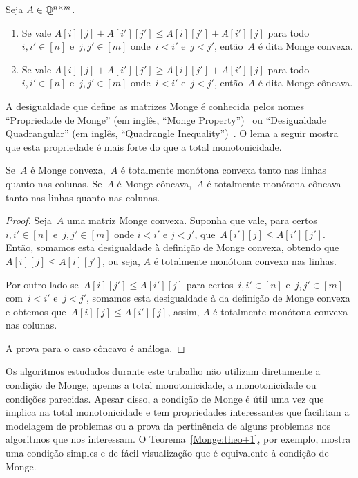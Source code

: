 \begin{defi} \label{defi:MatrizMonge}
Seja $A \in \mathbb{Q}^{n \times m}$.
    \begin{enumerate}
        \item Se vale $A[i][j] + A[i'][j'] \leq A[i][j'] + A[i'][j]$ para todo~${i,i' \in [n]}$ e~${j,j' \in [m]}$ onde~${i<i'}$ e~${j<j'}$, então~$A$ é dita Monge convexa.
        \item Se vale $A[i][j] + A[i'][j'] \geq A[i][j'] + A[i'][j]$ para todo~${i,i' \in [n]}$ e~${j,j' \in [m]}$ onde~${i<i'}$ e~${j<j'}$, então~$A$ é dita Monge côncava.
    \end{enumerate}
\end{defi}

A desigualdade que define as matrizes Monge é conhecida pelos nomes ``Propriedade de Monge'' (em inglês, ``Monge Property'')~\cite{Burkard:1996} ou ``Desigualdade Quadrangular'' (em inglês, ``Quadrangle Inequality'')~\cite{Yao:1980,Bein:2009}. O lema a seguir mostra que esta propriedade é mais forte do que a total monotonicidade. 

\begin{lema} \label{Monge:MCtoTM}
Se~$A$ é Monge convexa,~$A$ é totalmente monótona convexa tanto nas linhas quanto nas colunas. Se~$A$ é Monge côncava,~$A$ é totalmente monótona côncava tanto nas linhas quanto nas colunas.
\end{lema}

\begin{proof}
Seja~$A$ uma matriz Monge convexa. Suponha que vale, para certos~$i,i' \in [n]$ e~${ j,j' \in [m] }$ onde $i < i'$ e $j < j'$, que~$A[i'][j] \leq A[i'][j']$. Então, somamos esta desigualdade à definição de Monge convexa, obtendo que~$A[i][j] \leq A[i][j']$, ou seja, $A$ é totalmente monótona convexa nas linhas.  

Por outro lado se~${ A[i][j'] \leq A[i'][j] }$ para certos~${ i,i' \in [n] }$ e~${ j,j' \in [m] }$ com~${i < i'}$ e~${j < j'}$, somamos esta desigualdade à da definição de Monge convexa e obtemos que~${ A[i][j] \leq A[i'][j] }$, assim, $A$ é totalmente monótona convexa nas colunas.  

A prova para o caso côncavo é análoga.
\end{proof}

Os algoritmos estudados durante este trabalho não utilizam diretamente a condição de Monge, apenas a total monotonicidade, a monotonicidade ou condições parecidas. Apesar disso, a condição de Monge é útil uma vez que implica na total monotonicidade e tem propriedades interessantes que facilitam a modelagem de problemas ou a prova da pertinência de alguns problemas nos algoritmos que nos interessam. O Teorema~\ref{Monge:theo+1}, por exemplo, mostra uma condição simples e de fácil visualização que é equivalente à condição de Monge.

